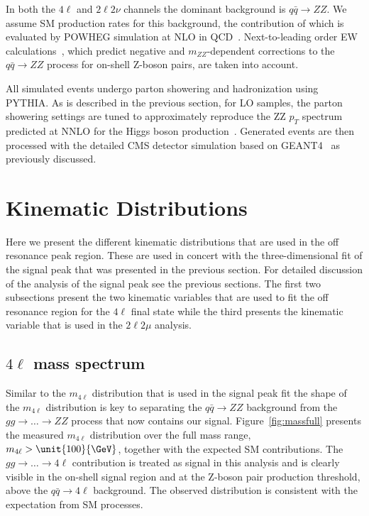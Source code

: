 In both the $4\ell$ and $2\ell2\nu$ channels the dominant background is $q\bar{q} \to ZZ$.
We assume SM production rates for this background, the contribution of which is evaluated by \textsc{POWHEG}
simulation at NLO in QCD~\cite{Melia:2011tj}. Next-to-leading order EW calculations~\cite{Bierweiler:2013dja,Baglio:2013toa},
which predict negative and $m_{ZZ}$-dependent corrections to the $q\bar{q} \to ZZ$
process for on-shell Z-boson pairs, are taken into account.

All simulated events undergo parton showering and hadronization using \textsc{PYTHIA}.
As is described in the previous section, for LO samples, the parton showering settings
are tuned to approximately reproduce the ZZ $p_{T}$ spectrum predicted at NNLO for the Higgs boson
production~\cite{deFlorian:2012mx}. Generated events are then processed with the detailed CMS detector simulation
based on \textsc{GEANT4}~\cite{Allison:2006ve,Agostinelli2003250} as previously discussed.

\section{Kinematic Distributions}
\label{sec:Width_Kin_Dists}

Here we present the different kinematic distributions that are used in the off resonance peak region. These are used in concert with the three-dimensional fit of the signal peak that was presented in the previous section. For detailed discussion of the analysis of the signal peak see the previous sections. The first two subsections present the two kinematic variables that are used to fit the off resonance region for the $4\ell$ final state while the third presents the kinematic variable that is used in the $2\ell2\mu$ analysis.

\subsection{$4\ell$ mass spectrum}
\label{sec:width_m4l_spectrum}

Similar to the $m_{4\ell}$ distribution that is used in the signal peak fit the shape of the $m_{4\ell}$ distribution is key to separating the $q\bar{q} \to ZZ$ background from the $gg \to \ldots \to ZZ$ process that now contains our signal. Figure~\ref{fig:massfull} presents the measured $m_{4\ell}$ distribution over the full mass range, $m_{4\ell} > \unit{100}{\GeV}$, together with the expected SM contributions. The $gg \to \ldots \to 4\ell$ contribution is treated as signal in this analysis and is clearly visible in the on-shell signal region and at the Z-boson pair production threshold, above the $q\bar{q} \to 4\ell$ background. The observed distribution is consistent with the expectation from SM processes.


